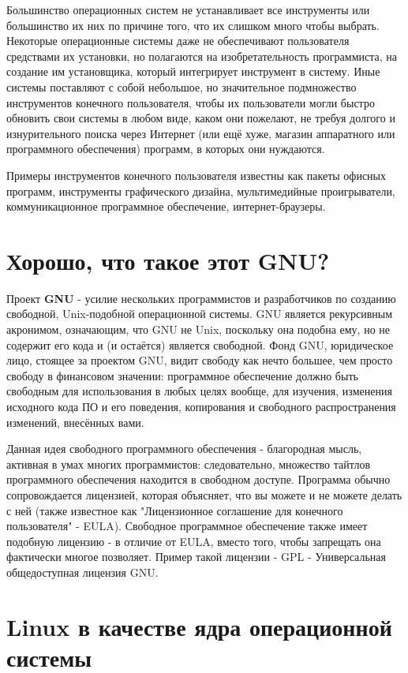 \documentclass[12pt]{book}
\begin{document}
Большинство операционных систем не устанавливает все инструменты или большинство их них по причине того, что их слишком много чтобы выбрать. Некоторые операционные системы даже не обеспечивают пользователя средствами их установки, но полагаются на изобретательность программиста, на создание им установщика, который интегрирует инструмент в систему. Иные  системы поставляют с собой небольшое, но значительное подмножество инструментов конечного пользователя, чтобы их пользователи могли быстро обновить свои системы в любом виде, каком они пожелают, не требуя долгого и изнурительного поиска через Интернет (или ещё хуже, магазин аппаратного или программного обеспечения)  программ, в которых они нуждаются.

Примеры инструментов конечного пользователя известны как пакеты офисных программ, инструменты графического дизайна, мультимедийные проигрыватели, коммуникационное программное обеспечение, интернет-браузеры.

\section{Хорошо, что такое этот GNU?}

Проект {\color{gentoo}\textbf{GNU}} - усилие нескольких программистов и разработчиков по созданию свободной,  Unix-подобной операционной системы. GNU является рекурсивным акронимом, означающим, что GNU не Unix, поскольку она подобна ему, но не содержит его кода и (и остаётся) является свободной. Фонд GNU, юридическое лицо, стоящее за проектом GNU, видит свободу как нечто большее, чем просто свободу в финансовом значении: программное обеспечение должно быть свободным для использования в любых целях вообще,  для изучения,  изменения исходного кода ПО и его поведения, копирования и свободного распространения изменений, внесённых вами.

Данная идея свободного программного обеспечения - благородная мысль, активная в умах многих программистов: следовательно, множество тайтлов программного обеспечения находится в свободном доступе. Программа обычно сопровождается лицензией, которая объясняет, что вы можете и не можете делать с ней (также известное как "Лицензионное соглашение для конечного пользователя" - EULA). Свободное программное обеспечение также имеет подобную лицензию - в отличие от EULA, вместо того, чтобы запрещать она фактически многое позволяет. Пример такой лицензии - GPL - Универсальная общедоступная лицензия GNU.

\section{Linux в качестве ядра операционной системы}
\end{document}
